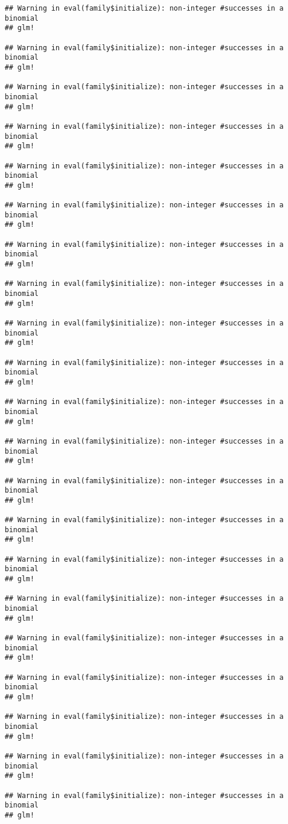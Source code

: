 \documentclass[10pt,]{book}
\begin{document}
\begin{verbatim}
## Warning in eval(family$initialize): non-integer #successes in a binomial
## glm!

## Warning in eval(family$initialize): non-integer #successes in a binomial
## glm!

## Warning in eval(family$initialize): non-integer #successes in a binomial
## glm!

## Warning in eval(family$initialize): non-integer #successes in a binomial
## glm!

## Warning in eval(family$initialize): non-integer #successes in a binomial
## glm!

## Warning in eval(family$initialize): non-integer #successes in a binomial
## glm!

## Warning in eval(family$initialize): non-integer #successes in a binomial
## glm!

## Warning in eval(family$initialize): non-integer #successes in a binomial
## glm!

## Warning in eval(family$initialize): non-integer #successes in a binomial
## glm!

## Warning in eval(family$initialize): non-integer #successes in a binomial
## glm!

## Warning in eval(family$initialize): non-integer #successes in a binomial
## glm!

## Warning in eval(family$initialize): non-integer #successes in a binomial
## glm!

## Warning in eval(family$initialize): non-integer #successes in a binomial
## glm!

## Warning in eval(family$initialize): non-integer #successes in a binomial
## glm!

## Warning in eval(family$initialize): non-integer #successes in a binomial
## glm!

## Warning in eval(family$initialize): non-integer #successes in a binomial
## glm!

## Warning in eval(family$initialize): non-integer #successes in a binomial
## glm!

## Warning in eval(family$initialize): non-integer #successes in a binomial
## glm!

## Warning in eval(family$initialize): non-integer #successes in a binomial
## glm!

## Warning in eval(family$initialize): non-integer #successes in a binomial
## glm!

## Warning in eval(family$initialize): non-integer #successes in a binomial
## glm!


\end{verbatim}
\end{document}
